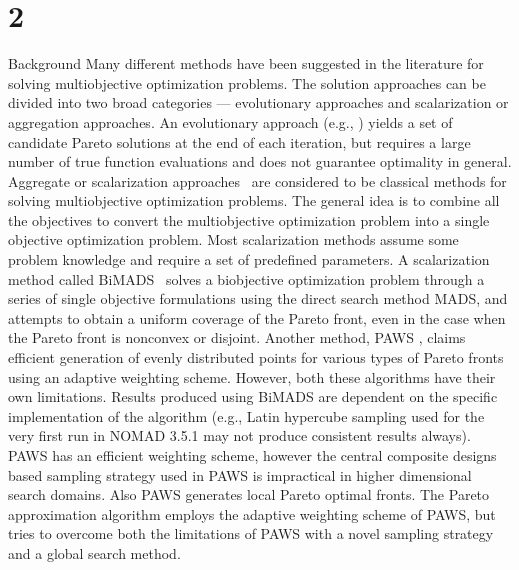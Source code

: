 \section{2}{Background} 
Many different methods have been suggested in the literature for solving 
multiobjective optimization problems. The solution approaches can be divided 
into two broad categories --- evolutionary approaches and scalarization or 
aggregation approaches. An evolutionary approach (e.g., \DPAM) yields a set 
of candidate Pareto solutions at the end of each iteration, but  requires a 
large number of true function evaluations and does not guarantee optimality in 
general. Aggregate or scalarization approaches \E\ are considered to be 
classical methods for solving multiobjective optimization problems. The 
general idea is to combine all the objectives to convert the multiobjective 
optimization problem into a single objective optimization problem. Most 
scalarization methods assume some problem knowledge and require a set of 
predefined parameters. A scalarization method called BiMADS \ASZ\ solves a 
biobjective optimization problem through a series of single objective 
formulations using the direct search method MADS, and attempts to obtain a 
uniform coverage of the Pareto front, even in the case when the Pareto front 
is nonconvex or disjoint. Another method, PAWS \RKW, claims efficient 
generation of evenly distributed points for various types of Pareto fronts 
using an adaptive weighting scheme. However, both these algorithms have their 
own limitations. Results produced using BiMADS are dependent on the specific 
implementation of the algorithm (e.g., Latin hypercube sampling used for the 
very first run in NOMAD 3.5.1 may not produce consistent results always). PAWS 
has an efficient weighting scheme, however the central composite designs based 
sampling strategy used in PAWS is impractical in higher dimensional search 
domains. Also PAWS generates local Pareto optimal fronts. The Pareto 
approximation algorithm employs the adaptive weighting scheme of PAWS, but 
tries to overcome both the limitations of PAWS with a novel sampling strategy 
and a global search method. 


